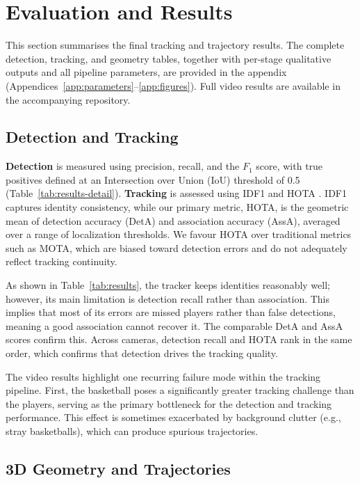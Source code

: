 \section{Evaluation and Results}\label{sec:evaluation_results}

This section summarises the final tracking and trajectory results.
The complete detection, tracking, and geometry tables, together with per-stage qualitative outputs and all pipeline parameters, are provided in the appendix (Appendices~\ref{app:parameters}--\ref{app:figures}).
Full video results are available in the accompanying repository.

\subsection{Detection and Tracking}

\textbf{Detection} is measured using precision, recall, and the $F_1$ score, with true positives defined at an Intersection over Union (IoU) threshold of 0.5 (Table~\ref{tab:results-detail}).
\textbf{Tracking} is assessed using IDF1 and HOTA \cite{hota}.
IDF1 captures identity consistency, while our primary metric, HOTA, is the geometric mean of detection accuracy (DetA) and association accuracy (AssA), averaged over a range of localization thresholds.
We favour HOTA over traditional metrics such as MOTA, which are biased toward detection errors and do not adequately reflect tracking continuity.

As shown in Table~\ref{tab:results}, the tracker keeps identities reasonably well; however, its main limitation is detection recall rather than association.
This implies that most of its errors are missed players rather than false detections, meaning a good association cannot recover it.
The comparable DetA and AssA scores confirm this.
Across cameras, detection recall and HOTA rank in the same order, which confirms that detection drives the tracking quality.

The video results highlight one recurring failure mode within the tracking pipeline.
First, the basketball poses a significantly greater tracking challenge than the players, serving as the primary bottleneck for the detection and tracking performance.
This effect is sometimes exacerbated by background clutter (e.g., stray basketballs), which can produce spurious trajectories.

\subsection{3D Geometry and Trajectories}

